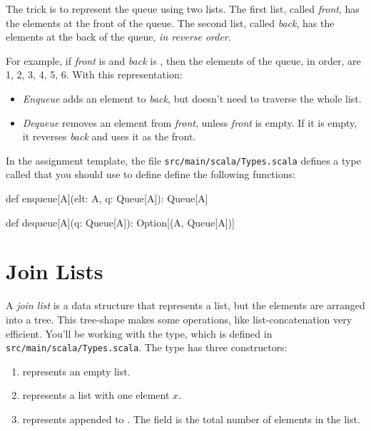\documentclass{book}
\begin{document}
The trick is to represent the queue using two lists. The first list, called
\emph{front}, has the elements at the front of the queue. The second list, called
\emph{back}, has the elements at the back of the queue, \emph{in reverse order}.

For example, if \emph{front} is  and \emph{back} is , then
the elements of the queue, in order, are 1, 2, 3, 4, 5, 6. With this
representation:

\begin{itemize}

\item \emph{Enqueue} adds an element to \emph{back}, but doesn't need to
  traverse the whole list.

\item \emph{Dequeue} removes an element from \emph{front}, unless \emph{front}
  is empty. If it is empty, it reverses \emph{back} and uses it as the front.

\end{itemize}

In the assignment template, the file \texttt{src/main/scala/Types.scala}
defines a type called  that you should use to define
 define the following functions:

\begin{scalacode}
def enqueue[A](elt: A, q: Queue[A]): Queue[A]

def dequeue[A](q: Queue[A]): Option[(A, Queue[A])]
\end{scalacode}

\section{Join Lists}

A \emph{join list} is a data structure that represents a list, but the
elements are arranged into a tree. This tree-shape makes some operations,
like list-concatenation very efficient.
You'll be working with the  type, which is
defined in \texttt{src/main/scala/Types.scala}.
 The type has three constructors:

\begin{enumerate}

\item {} represents an empty list.

\item {} represents a list with one element $x$.

\item {} represents  appended to
       . The  field is the total number of
       elements in the list.

\end{enumerate}
\end{document}

